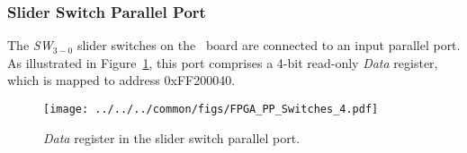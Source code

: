 \subsubsection{Slider Switch Parallel Port}

The {\it SW}$_{3-0}$ slider switches on the \DEBoard~board are connected to an input parallel
port.  As illustrated in Figure~\ref{fig:slider_port}, this port 
comprises a 4-bit read-only {\it Data} register, which is mapped to address {\sf 0xFF200040}.

\begin{figure}[h]
   \begin{center}
       \texttt{[image: ../../../common/figs/FPGA\_PP\_Switches\_4.pdf]}
   \end{center}
   \caption{{\it Data} register in the slider switch parallel port.}
	\label{fig:slider_port}
\end{figure}